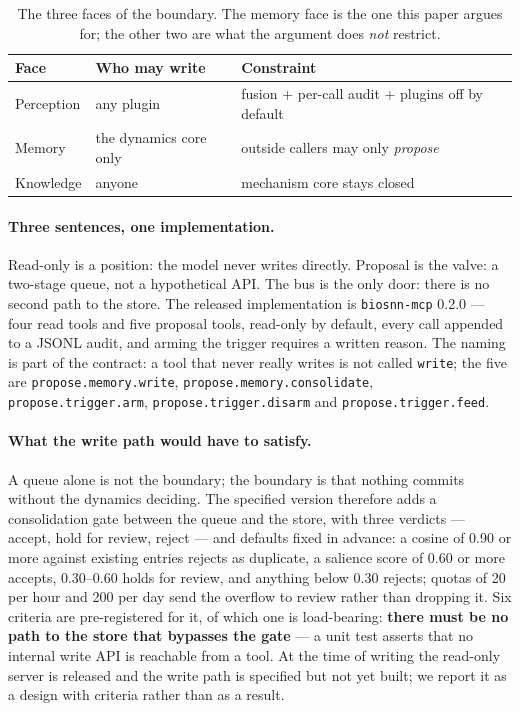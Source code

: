 \documentclass[11pt]{article}
\begin{document}
\begin{table}[h]
\centering
\small
\begin{tabular}{lll}
\toprule
Face & Who may write & Constraint \\
\midrule
Perception & any plugin   & fusion + per-call audit + plugins off by default \\
Memory     & the dynamics core only & outside callers may only \emph{propose} \\
Knowledge  & anyone       & mechanism core stays closed \\
\bottomrule
\end{tabular}
\caption{The three faces of the boundary. The memory face is the one this paper
argues for; the other two are what the argument does \emph{not} restrict.}
\label{tab:faces}
\end{table}

\paragraph{Three sentences, one implementation.} Read-only is a position: the model
never writes directly. Proposal is the valve: a two-stage queue, not a hypothetical
API. The bus is the only door: there is no second path to the store. The released
implementation is \texttt{biosnn-mcp} 0.2.0 --- four read tools and five proposal
tools, read-only by default, every call appended to a JSONL audit, and arming the
trigger requires a written reason. The naming is part of the contract: a tool that
never really writes is not called \texttt{write}; the five are
\texttt{propose.memory.write}, \texttt{propose.memory.consolidate},
\texttt{propose.trigger.arm}, \texttt{propose.trigger.disarm} and
\texttt{propose.trigger.feed}.

\paragraph{What the write path would have to satisfy.} A queue alone is not the
boundary; the boundary is that nothing commits without the dynamics deciding. The
specified version therefore adds a consolidation gate between the queue and the
store, with three verdicts --- accept, hold for review, reject --- and defaults
fixed in advance: a cosine of 0.90 or more against existing entries rejects as
duplicate, a salience score of 0.60 or more accepts, 0.30--0.60 holds for review, and
anything below 0.30 rejects; quotas of 20 per hour and 200 per day send the overflow
to review rather than dropping it. Six criteria are pre-registered for it, of which
one is load-bearing: \textbf{there must be no path to the store that bypasses the
gate} --- a unit test asserts that no internal write API is reachable from a tool.
At the time of writing the read-only server is released and the write path is
specified but not yet built; we report it as a design with criteria rather than as
a result.
\end{document}

